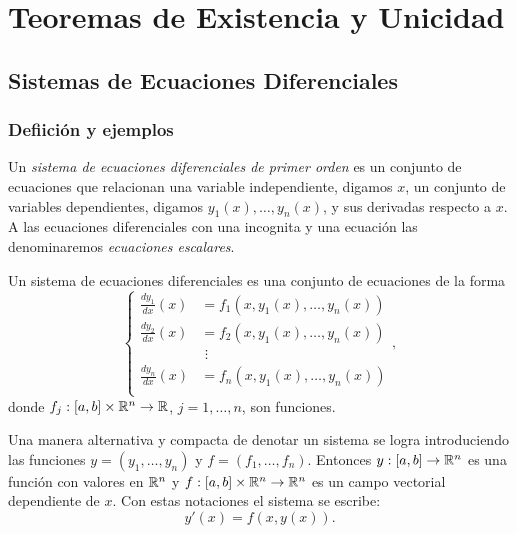 \chapter{Teoremas de Existencia y Unicidad}

\section{Sistemas de Ecuaciones Diferenciales}
\subsection{Defiición y ejemplos}
Un \emph{sistema de ecuaciones diferenciales de primer orden} es un conjunto  de ecuaciones que relacionan una variable independiente, digamos $x$, un conjunto de variables dependientes, digamos $y_1(x),\ldots,y_n(x)$, y sus derivadas respecto a $x$. A las ecuaciones diferenciales con una incognita y una ecuación las denominaremos \emph{ecuaciones escalares}.

\begin{definicion} Un sistema de ecuaciones diferenciales es una conjunto de ecuaciones de la forma
\begin{equation}\label{eq:sist_ecua}
\left\{
\begin{split}
 \frac{dy_1}{dx}(x)&=f_1(x,y_1(x),\ldots,y_n(x))\\
  \frac{dy_2}{dx}(x)&=f_2(x,y_1(x),\ldots,y_n(x))\\
       &\,\,\vdots                                   \\
 \frac{dy_n}{dx}(x)&=f_n(x,y_1(x),\ldots,y_n(x))\\
\end{split}\right.,
\end{equation}
donde $f_j:[a,b]\times\rr^n\to\rr$, $j=1,\ldots,n$, son funciones.

Una manera alternativa y compacta de denotar un sistema se logra introduciendo las funciones $y=(y_1,\ldots,y_n)$  y $f=(f_1,\ldots,f_n)$. Entonces $y:[a,b]\to\rr^n$ es una función con valores en $\rr^n$ y $f:[a,b]\times \rr^n\to\rr^n$ es un campo vectorial dependiente de $x$. Con estas notaciones el sistema se escribe:
\begin{equation}\label{eq:sist_ecua_comp}
 y'(x)=f(x,y(x)).
\end{equation}

\end{definicion}






